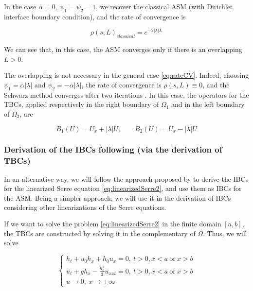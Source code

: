  \indent In the case $\alpha = 0,\ \psi_1 = \psi_2 = 1$, we recover the classical ASM (with Dirichlet interface boundary condition), and the rate of convergence is 
 
  \begin{equation}
 \rho(s,L)_{classical} = e^{-2|\lambda|L}
 \end{equation}
 
 \indent We can see that, in this case, the ASM converges only if there is an overlapping $L>0$.
 
 \indent The overlapping is not necessary in the general case \eqref{eq:rateCV}. Indeed, choosing $\psi_1 =\alpha |\lambda|$ and $\psi_2 =- \alpha|\lambda|$, the rate of convergence is $ \rho(s,L) \equiv 0$, and the Schwarz method converges after two iterations \cite{Gander2001b}. In this case, the operators for the TBCs, applied respectively in the right boundary of $\Omega_1$ and in the left boundary of $\Omega_2$, are
 
 \begin{equation*}
 	B_1(U) = U_x + |\lambda|U, \qquad B_2(U) = U_x - |\lambda|U
 \end{equation*}
 
 \subsubsection{Derivation of the IBCs following \cite{besse2015} (via the derivation of TBCs)}
 
 \indent In an alternative way, we will follow the approach proposed by \cite{besse2015} to derive the IBCs for the linearized Serre equation \eqref{eq:linearizedSerre2}, and use them as IBCs for the ASM. Being a simpler approach, we will use it in the derivation of IBCs considering other linearizations of the Serre equations.
 
 \indent If we want to solve the problem \eqref{eq:linearizedSerre2} in the finite domain $[a,b]$, the TBCs are constructed by solving it in the complementary of $\Omega$. Thus, we will solve
 
 \begin{equation}
\label{eq:linearizedSerre2Complementary}
\begin{cases}
h_t + u_0h_x + h_0u_x = 0, \ t>0, x<a \ \text{or} \ x >b \\
u_t +  gh_x - \frac{h_0^2}{3}u_{xxt} = 0, \ t>0, x<a \ \text{or} \ x >b  \\
u \longrightarrow 0, \ x \longrightarrow \pm \infty
\end{cases}
\end{equation} 

